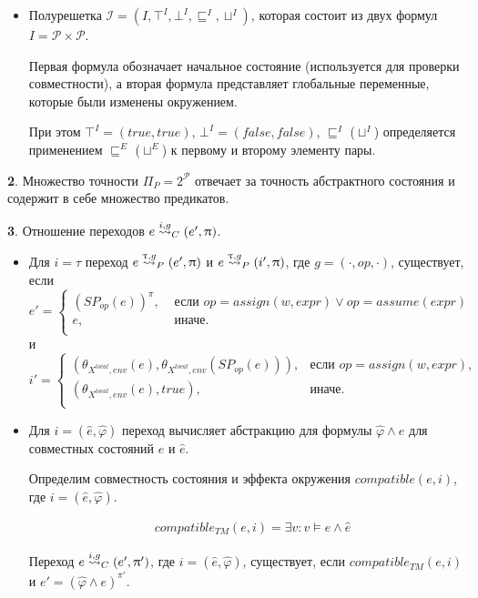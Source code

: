 \begin{itemize}
\item Полурешетка
$\mathcal{I}=(I, \top^I, \bot^I, \sqsubseteq^I, \sqcup^I)$, которая состоит из двух формул $I=\mathscr{P}\times \mathscr{P}$.

Первая формула обозначает начальное состояние (используется для проверки совместности), а вторая формула представляет глобальные переменные, которые были изменены окружением.

При этом $\top^I=(true,true)$, $\bot^I=(false,false)$, 
$\sqsubseteq^I$ ($\sqcup^I$)  определяется применением  $\sqsubseteq^E$ ($\sqcup^E$) к первому и второму элементу пары.
\end{itemize}

{\textbf 2.} Множество точности $\Pi_P = 2^\mathscr{P}$ отвечает за точность абстрактного состояния и содержит в себе множество предикатов.

{\textbf 3.} Отношение переходов $e \stackrel{i,g}{\leadsto}_C (e',\uppi)$.

\begin{itemize}
\item Для $i=\tau$ переход $e \stackrel{\uptau, g}{\leadsto}_{P} (e', \uppi)$ и $e \stackrel{\uptau, g}{\leadsto}_{P} (i', \uppi)$, где $g = (\cdot, op, \cdot)$, существует, если
$$e'= 
\left\lbrace\begin{array}{ll}
(SP_{op}(e))^\pi, & \mbox{ если } op=assign(w, expr) \lor op=assume(expr)\\
e, &\mbox{ иначе}.\\
\end{array}
\right.
$$
и 
$$i'= 
\left\lbrace
\begin{array}{ll}
(\theta_{X^{local},env}(e),\theta_{X^{local},env}(SP_{op}(e))),&\mbox{если } op=assign(w, expr),\\
(\theta_{X^{local},env}(e),true),&\mbox{иначе}.\\
\end{array}
\right.
$$


\item Для $i=(\hat e,\hat \varphi)$ переход вычисляет абстракцию для формулы $\hat \varphi \land e$ для совместных состояний $e$ и $\hat e$.

Определим совместность состояния и эффекта окружения $compatible(e, i)$, где  $i=(\hat e,\hat \varphi)$.

\begin{equation}
\label{cpa_predicate_compatible}
\begin{aligned}
& compatible_{TM}(e, i) = \exists v: v \models e \land \hat e
\end{aligned}
\end{equation}

Переход $e \stackrel{i, g}{\leadsto}_{C} (e', \uppi')$, где $i=(\hat e,\hat \varphi)$, существует, если
$compatible_{TM}(e,i)$ и $e'= (\hat \varphi \land e)^{\pi'}$.
\end{itemize}

